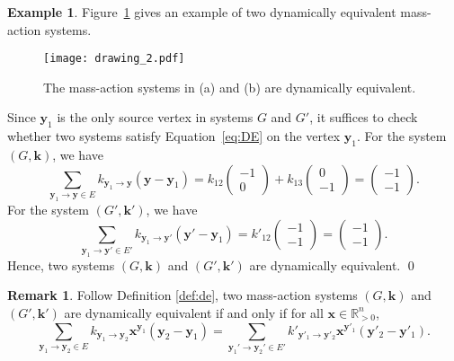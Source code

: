 \documentclass[11pt]{article}
\theoremstyle{plain}
\theoremstyle{definition}
\newtheorem{example}[theorem]{Example}
\newtheorem{remark}[theorem]{Remark}
\theoremstyle{remark}
\newcommand\RR{\mathbb{R}}
\newcommand\by{\boldsymbol{y}}
\newcommand\bk{\boldsymbol{k}}
\newcommand\bx{\boldsymbol{x}}
\begin{document}

\begin{example}
Figure~\ref{fig:dyn_equiv} gives an example of two dynamically equivalent mass-action systems. 

\begin{figure}[!ht]
\centering
\texttt{[image: drawing\_2.pdf]}
\caption{\small The mass-action systems in (a) and (b) are dynamically equivalent.}
\label{fig:dyn_equiv}
\end{figure} 

Since $\by_1$ is the only source vertex in systems $G$ and $G'$, it suffices to check whether two systems satisfy Equation~\eqref{eq:DE} on the vertex $\by_1$.
For the system $(G, \bk)$, we have
\begin{equation}
\sum_{\by_1 \rightarrow \by \in E} k_{\by_1 \rightarrow \by} (\by - \by_1) =
k_{12} \begin{pmatrix} -1 \\ 0 \end{pmatrix}
+ k_{13} \begin{pmatrix} 0 \\ -1 \end{pmatrix}
= \begin{pmatrix} -1 \\ -1 \end{pmatrix}.
\end{equation}
For the system $(G', \bk')$, we have
\begin{equation}
\sum_{\by_1 \rightarrow \by' \in E'} k_{\by_1 \rightarrow \by'} (\by' - \by_1) =
k'_{12} \begin{pmatrix} -1 \\ -1 \end{pmatrix}
= \begin{pmatrix} -1 \\ -1 \end{pmatrix}.
\end{equation}
Hence, two systems $(G, \bk)$ and $(G', \bk')$ are dynamically equivalent.
\qed
\end{example}

\begin{remark}
Follow Definition \ref{def:de}, two mass-action systems $(G, \bk)$ and $(G', \bk')$ are dynamically equivalent if and only if for all $\bx \in \RR_{>0}^{n}$,
\begin{equation}
\label{eq:eqDE}
\sum_{\by_1 \to \by_2 \in E} k_{\by_1  \to \by_2} \bx^{\by_1} (\by_2 - \by_1) 
= \sum_{\by_1' \to \by_2' \in E'} k'_{\by'_1  \to \by'_2} \bx^{\by'_1} (\by'_2 - \by'_1).
\end{equation}
\end{remark}
\end{document}
